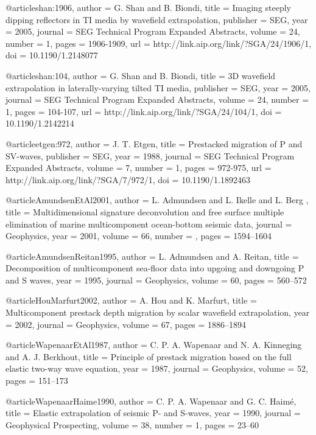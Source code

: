 @article{shan:1906,
  author =	 {G. Shan and B. Biondi},
  title =	 {Imaging steeply dipping reflectors in {TI} media by
                  wavefield extrapolation},
  publisher =	 {SEG},
  year =	 2005,
  journal =	 {SEG Technical Program Expanded Abstracts},
  volume =	 24,
  number =	 1,
  pages =	 {1906-1909},
  url =		 {http://link.aip.org/link/?SGA/24/1906/1},
  doi =		 {10.1190/1.2148077}
}

@article{shan:104,
  author =	 {G. Shan and B. Biondi},
  title =	 {{3D} wavefield extrapolation in laterally-varying
                  tilted {TI} media},
  publisher =	 {SEG},
  year =	 2005,
  journal =	 {SEG Technical Program Expanded Abstracts},
  volume =	 24,
  number =	 1,
  pages =	 {104-107},
  url =		 {http://link.aip.org/link/?SGA/24/104/1},
  doi =		 {10.1190/1.2142214}
}

@article{etgen:972,
  author =	 {J. T. Etgen},
  title =	 {Prestacked migration of {P} and {S}{V}-waves},
  publisher =	 {SEG},
  year =	 1988,
  journal =	 {SEG Technical Program Expanded Abstracts},
  volume =	 7,
  number =	 1,
  pages =	 {972-975},
  url =		 {http://link.aip.org/link/?SGA/7/972/1},
  doi =		 {10.1190/1.1892463}
}

@article{AmundsenEtAl2001,
author = {L. Admundsen and L. Ikelle and L. Berg },
title = {Multidimensional signature deconvolution and free surface multiple elimination of marine multicomponent ocean-bottom seismic data},
journal = {Geophysics},
year = {2001},
volume = {66},
number = {},
pages = {1594--1604}
}

@article{AmundsenReitan1995,
  author =	 {L. Admundsen and A. Reitan},
  title =	 {Decomposition of multicomponent sea-floor data into
                  upgoing and downgoing {P} and {S} waves},
  year =	 1995,
  journal =	 {Geophysics},
  volume =	 60,
  pages =	 {560--572}
}

@article{HouMarfurt2002,
  author =	 {A. Hou and K. Marfurt},
  title =	 {Multicomponent prestack depth migration by scalar
                  wavefield extrapolation},
  year =	 2002,
  journal =	 {Geophysics},
  volume =	 67,
  pages =	 {1886--1894}
}

@article{WapenaarEtAl1987,
  author =	 {C. P. A. Wapenaar and N. A. Kinneging and
                  A. J. Berkhout},
  title =	 {Principle of prestack migration based on the full
                  elastic two-way wave equation},
  year =	 1987,
  journal =	 {Geophysics},
  volume =	 52,
  pages =	 {151--173}
}

@article{WapenaarHaime1990,
  author =	 {C. P. A. Wapenaar and G. C. Haim\'{e}},
  title =	 {Elastic extrapolation of seismic {P}- and {S}-waves},
  year =	 1990,
  journal =	 {Geophysical Prospecting},
  volume =	 38,
  number =	 1,
  pages =	 {23--60}
}

